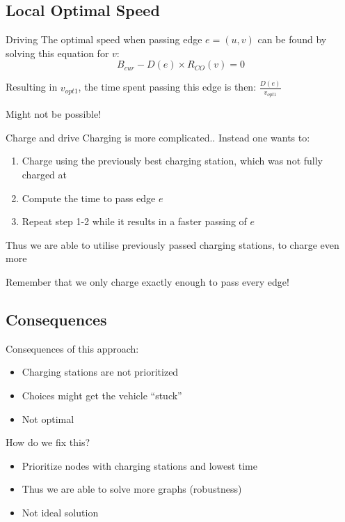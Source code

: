 \subsection{Local Optimal Speed}
\begin{frame}{Driving}
  The optimal speed when passing edge $e=(u,v)$ can be found by solving this equation for $v$:
  \[B_{cur} - D(e) \times R_{CO}(v)=0\]

  Resulting in $v_{opt1}$, the time spent passing this edge is then: $\frac{D(e)}{v_{opt1}}$

  Might not be possible!
\end{frame}
\begin{frame}{Charge and drive}
Charging is more complicated.. Instead one wants to:

\begin{enumerate}
    \item Charge using the previously best charging station, which was not fully charged at
    \item Compute the time to pass edge $e$
    \item Repeat step 1-2 while it results in a faster passing of $e$
  \end{enumerate}

  Thus we are able to utilise previously passed charging stations, to charge even more

  Remember that we only charge exactly enough to pass every edge!
\end{frame}

\subsection{Consequences}
\begin{frame}{Consequences of this approach:}
  \begin{itemize}
    \item Charging stations are not prioritized
    \item Choices might get the vehicle ``stuck''
    \item Not optimal
  \end{itemize}
  How do we fix this?
  \begin{itemize}
    \item Prioritize nodes with charging stations and lowest time
    \item Thus we are able to solve more graphs (robustness)
    \item Not ideal solution
  \end{itemize}
\end{frame}
